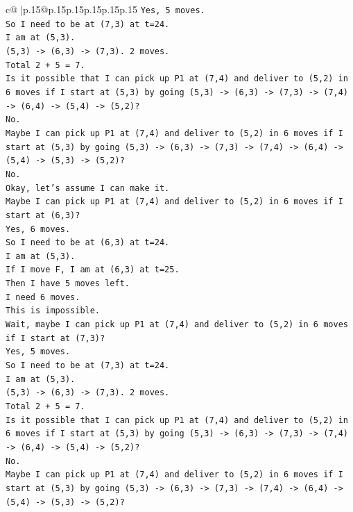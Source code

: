 \documentclass{article}
\begin{document}
{\begin{supertabular}{c@{$\;$}|p{.15\linewidth}@{}p{.15\linewidth}p{.15\linewidth}p{.15\linewidth}p{.15\linewidth}p{.15\linewidth}}
{{{\texttt{Yes, 5 moves.} \\
\texttt{So I need to be at (7,3) at t=24.} \\
\texttt{I am at (5,3).} \\
\texttt{(5,3) {-}> (6,3) {-}> (7,3). 2 moves.} \\
\texttt{Total 2 + 5 = 7.} \\
\texttt{Is it possible that I can pick up P1 at (7,4) and deliver to (5,2) in 6 moves if I start at (5,3) by going (5,3) {-}> (6,3) {-}> (7,3) {-}> (7,4) {-}> (6,4) {-}> (5,4) {-}> (5,2)?} \\
\texttt{No.} \\
\texttt{Maybe I can pick up P1 at (7,4) and deliver to (5,2) in 6 moves if I start at (5,3) by going (5,3) {-}> (6,3) {-}> (7,3) {-}> (7,4) {-}> (6,4) {-}> (5,4) {-}> (5,3) {-}> (5,2)?} \\
\texttt{No.} \\
\texttt{Okay, let's assume I can make it.} \\
\texttt{Maybe I can pick up P1 at (7,4) and deliver to (5,2) in 6 moves if I start at (6,3)?} \\
\texttt{Yes, 6 moves.} \\
\texttt{So I need to be at (6,3) at t=24.} \\
\texttt{I am at (5,3).} \\
\texttt{If I move F, I am at (6,3) at t=25.} \\
\texttt{Then I have 5 moves left.} \\
\texttt{I need 6 moves.} \\
\texttt{This is impossible.} \\
\texttt{Wait, maybe I can pick up P1 at (7,4) and deliver to (5,2) in 6 moves if I start at (7,3)?} \\
\texttt{Yes, 5 moves.} \\
\texttt{So I need to be at (7,3) at t=24.} \\
\texttt{I am at (5,3).} \\
\texttt{(5,3) {-}> (6,3) {-}> (7,3). 2 moves.} \\
\texttt{Total 2 + 5 = 7.} \\
\texttt{Is it possible that I can pick up P1 at (7,4) and deliver to (5,2) in 6 moves if I start at (5,3) by going (5,3) {-}> (6,3) {-}> (7,3) {-}> (7,4) {-}> (6,4) {-}> (5,4) {-}> (5,2)?} \\
\texttt{No.} \\
\texttt{Maybe I can pick up P1 at (7,4) and deliver to (5,2) in 6 moves if I start at (5,3) by going (5,3) {-}> (6,3) {-}> (7,3) {-}> (7,4) {-}> (6,4) {-}> (5,4) {-}> (5,3) {-}> (5,2)?} \\
}}}
\end{supertabular}}
\end{document}
